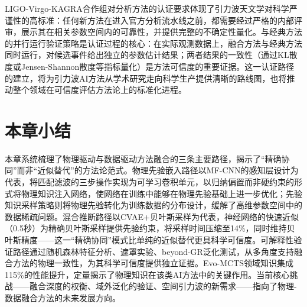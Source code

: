 LIGO-Virgo-KAGRA合作组对分析方法的认证要求体现了引力波天文学对科学严谨性的高标准：任何新方法在进入官方分析流水线之前，都需要经过严格的内部评审，展示其在相关参数空间内的可靠性，并提供完整的不确定性量化。与经典方法的并行运行验证策略是认证过程的核心：在实际观测数据上，融合方法与经典方法同时运行，对候选事件给出独立的参数估计结果；两者结果的一致性（通过KL散度或Jensen-Shannon散度等指标量化）是方法可信度的重要证据。这一认证路径的建立，将为引力波AI方法从学术研究走向科学生产提供清晰的路线图，也将推动整个领域在可信度评估方法论上的标准化进程。

\section{本章小结}

本章系统梳理了物理驱动与数据驱动方法融合的三条主要路径，揭示了“精确协同”而非“近似替代”的方法论范式。物理先验嵌入路径以MF-CNN的感知层设计为代表，将匹配滤波的三步操作实现为可学习卷积单元，以归纳偏置而非硬约束的形式将物理知识注入网络，使网络在训练中能够在物理先验基础上进一步优化；先验知识采样策略则将物理先验转化为训练数据的分布设计，缓解了高维参数空间中的数据稀疏问题。混合推断路径以CVAE+贝叶斯采样为代表，神经网络的快速近似（0.5秒）为精确贝叶斯采样提供先验约束，将采样时间压缩至14\%，同时维持贝叶斯精度——这一“精确协同”模式比单纯的近似替代更具科学可信度。可解释性验证路径通过随机森林特征分析、遮罩实验、beyond-GR泛化测试，从多角度支持融合方法的物理一致性，为其科学可信度提供独立证据。Evo-MCTS领域知识集成115\%的性能提升，定量揭示了物理知识在该类AI方法中的关键作用。当前核心挑战——融合深度的权衡、域外泛化的验证、空间引力波的新需求——指向了物理-数据融合方法的未来发展方向。
